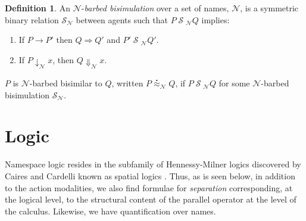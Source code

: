 \documentclass[]{amsart}
\makeatletter
\newcommand{\nameeq}{\mathbin{\equiv_N}}
\newcommand{\lift}[2]{#1 ! ( #2 )}
\newcommand{\quotep}[1]{@#1}
\newcommand{\red}{\rightarrow}
\newcommand{\wred}{\Rightarrow}
\newcommand{\parop}{\;|\;}		%
\newcommand{\rel}[1]{\;{\mathcal #1}\;} %
\newcommand{\wbbisim}{\stackrel{\centerdot}{\approx}} %
\newcommand{\fwbeq}{\stackrel{\circ}{\approx}}	%
\newcommand{\wbeq}{\approx}	%
\newtheorem{lem}[thm]{Lemma}
\theoremstyle{definition}
\newtheorem{defn}[thm]{Definition}
\theoremstyle{remark}
\newtheorem{rem}[thm]{Remark}
\numberwithin{equation}{subsection}
\makeatother
\begin{document}
\begin{defn}
An  ${\mathcal N}$-\emph{barbed bisimulation} over a set of names, ${\mathcal N}$, is a symmetric binary relation 
${\mathcal S}_{\mathcal N}$ between agents such that $P\rel{S}_{\mathcal N}Q$ implies:
\begin{enumerate}
\item If $P \red P'$ then $Q \wred Q'$ and $P'\rel{S}_{\mathcal N} Q'$.
\item If $P\downarrow_{\mathcal N} x$, then $Q\Downarrow_{\mathcal N} x$.
\end{enumerate}
$P$ is ${\mathcal N}$-barbed bisimilar to $Q$, written
$P \wbbisim_{\mathcal N} Q$, if $P \rel{S}_{\mathcal N} Q$ for some ${\mathcal N}$-barbed bisimulation ${\mathcal S}_{\mathcal N}$.
\end{defn}






\section{Logic}
Namespace logic resides in the subfamily of Hennessy-Milner logics
discovered by Caires and Cardelli known as spatial logics
\cite{DBLP:journals/tcs/CairesC04}. Thus, as is seen below, in
addition to the action modalities, we also find formulae for
\emph{separation} corresponding, at the logical level, to the
structural content of the parallel operator at the level of the
calculus. Likewise, we have quantification over names. 
\end{document}
